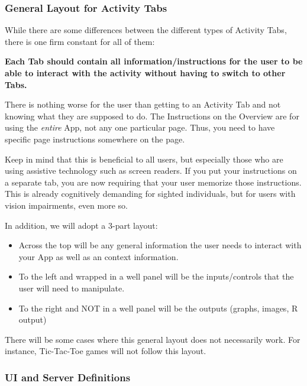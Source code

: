 \documentclass[
]{book}
\providecommand{\tightlist}{%
  \setlength{\itemsep}{0pt}\setlength{\parskip}{0pt}}
\begin{document}
\hypertarget{general-layout-for-activity-tabs-1}{%
\subsubsection{General Layout for Activity Tabs}\label{general-layout-for-activity-tabs-1}}

While there are some differences between the different types of Activity Tabs, there is one firm constant for all of them:

\textbf{Each Tab should contain all information/instructions for the user to be able to interact with the activity without having to switch to other Tabs.}

There is nothing worse for the user than getting to an Activity Tab and not knowing what they are supposed to do. The Instructions on the Overview are for using the \emph{entire} App, not any one particular page. Thus, you need to have specific page instructions somewhere on the page.

Keep in mind that this is beneficial to all users, but especially those who are using assistive technology such as screen readers. If you put your instructions on a separate tab, you are now requiring that your user memorize those instructions. This is already cognitively demanding for sighted individuals, but for users with vision impairments, even more so.

In addition, we will adopt a 3-part layout:

\begin{itemize}
\tightlist
\item
  Across the top will be any general information the user needs to interact with your App as well as an context information.
\item
  To the left and wrapped in a well panel will be the inputs/controls that the user will need to manipulate.
\item
  To the right and NOT in a well panel will be the outputs (graphs, images, R output)
\end{itemize}

There will be some cases where this general layout does not necessarily work. For instance, Tic-Tac-Toe games will not follow this layout.

\hypertarget{ui-and-server-definitions-1}{%
\subsubsection{UI and Server Definitions}\label{ui-and-server-definitions-1}}
\end{document}
